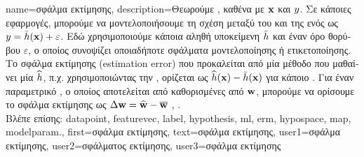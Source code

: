 {name={\foreignlanguage{greek}{σφάλμα εκτίμησης}},
	description={\foreignlanguage{greek}{Θεωρούμε} , 
		\foreignlanguage{greek}{καθένα με}  ${\bf x}$ \foreignlanguage{greek}{και}  
		$y$. \foreignlanguage{greek}{Σε κάποιες εφαρμογές, μπορούμε να μοντελοποιήσουμε τη σχέση μεταξύ του}  
		\foreignlanguage{greek}{και της}  \foreignlanguage{greek}{ενός}  \foreignlanguage{greek}{ως} 
		$y = \bar{h}({\bf x}) + \varepsilon$. \foreignlanguage{greek}{Εδώ χρησιμοποιούμε κάποια αληθή υποκείμενη}
		 $\bar{h}$ \foreignlanguage{greek}{και έναν όρο θορύβου $\varepsilon$, 
		ο οποίος συνοψίζει οποιαδήποτε σφάλματα μοντελοποίησης ή ετικετο\-ποί\-ησης. Το σφάλμα εκτίμησης} (estimation error) 
		\foreignlanguage{greek}{που προκαλείται από μία μέθοδο}  \foreignlanguage{greek}{που μαθαίνει μία}  
		$\widehat{h}$, \foreignlanguage{greek}{π.χ. χρησιμοποιώντας την} , \foreignlanguage{greek}{ορίζεται ως  
		$\widehat{h}({\bf x}) - \bar{h}({\bf x})$ για κάποιο} . 
		\foreignlanguage{greek}{Για έναν παραμετρικό} , \foreignlanguage{greek}{ο οποίος αποτελείται από} 
		  \foreignlanguage{greek}{καθορισμένες από}  ${\bf w}$, 
		\foreignlanguage{greek}{μπορούμε να ορίσουμε το σφάλμα εκτίμησης ως} $\Delta {\bf w} = \widehat{{\bf w}} - \overline{{\bf w}}$ 
		\cite{hastie01statisticallearning}, \cite{kay}.
		\\
		\foreignlanguage{greek}{Βλέπε επίσης:} \gls{datapoint}, \gls{featurevec}, \gls{label}, \gls{hypothesis}, \gls{ml}, \gls{erm}, \gls{hypospace}, 
		\gls{map}, \gls{modelparam}.},
	first={\foreignlanguage{greek}{σφάλμα εκτίμησης}},
	text={\foreignlanguage{greek}{σφάλμα εκτίμησης}},
	user1={\foreignlanguage{greek}{σφάλμα εκτίμησης}}, %
    	user2={\foreignlanguage{greek}{σφάλματος εκτίμησης}}, %
	user3={\foreignlanguage{greek}{σφάλμα εκτίμησης}} %
}


